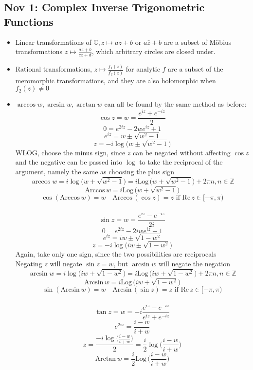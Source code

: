 \documentclass[10pt, oneside]{article}
\newcommand{\C}{\mathbb{C}}
\newcommand{\Z}{\mathbb{Z}}
\renewcommand{\Re}{\text{Re} \,}
\newcommand{\Log}{\text{Log} \,}
\newcommand{\Arccos}{\text{Arccos} \,}
\newcommand{\Arcsin}{\text{Arcsin} \,}
\newcommand{\Arctan}{\text{Arctan} \,}
\begin{document}
\subsection{Nov 1: Complex Inverse Trigonometric Functions}
\begin{itemize}
    \item Linear transformations of $\C, z \mapsto az + b$ or $a\bar{z} + b$ are a subset of M\"obius transformations $z \mapsto \frac{az + b}{cz + d}$, which arbitrary circles are closed under.
    \item Rational transformations, $z \mapsto \frac{f_1(z)}{f_2(z)}$ for analytic $f$ are a subset of the meromorphic transformations, and they are also holomorphic when $f_2(z) \neq 0$
    \item $\arccos w, \arcsin w, \arctan w$ can all be found by the same method as before:
        \[\cos z = w = \frac{e^{iz} + e^{-iz}}{2}\]
        \[0 = e^{2iz} - 2we^{iz} + 1\]
        \[e^{iz} = w \pm \sqrt{w^2 - 1}\]
        \[z = -i\log \big( w \pm \sqrt{w^2 - 1} \big)\]
        WLOG, choose the minus sign, since $z$ can be negated without affecting $\cos z$ and the negative can be passed into $\log$ to take the reciprocal of the argument, namely the same as choosing the plus sign
        \[\arccos w = i\log \big( w + \sqrt{w^2 - 1} \big) = i\Log \big( w + \sqrt{w^2 - 1} \big) + 2\pi n, n\in \Z\]
        \[\Arccos w = i\Log \big( w + \sqrt{w^2 - 1} \big)\]
        \[\cos(\Arccos w) = w \quad \Arccos(\cos z) = z \text{ if } \Re z \in [-\pi,\pi)\]
        \\
        \[\sin z = w = \frac{e^{iz} - e^{-iz}}{2i}\]
        \[0 = e^{2iz} - 2iwe^{iz} - 1\]
        \[e^{iz} = iw \pm \sqrt{1 - w^2}\]
        \[z = -i\log \big(iw \pm \sqrt{1 - w^2})\]
        Again, take only one sign, since the two possibilities are reciprocals\\
        Negating $z$ will negate $\sin z = w$, but $\arcsin w$ will negate the negation
        \[\arcsin w = i\log \big(iw + \sqrt{1 - w^2} \big) = i\Log \big( iw + \sqrt{1- w^2} \big) + 2\pi n, n\in \Z\]
        \[\Arcsin w = i\Log \big(iw + \sqrt{1 - w^2} \big)\]
        \[\sin(\Arcsin w) = w \quad \Arcsin(\sin z) = z \text{ if } \Re z \in [-\pi,\pi)\]
        \\
        \[\tan z = w = -i \frac{e^{iz} - e^{-iz}}{e^{iz} + e^{-iz}}\]
        \[e^{2iz} = \frac{i - w}{i + w}\]
        \[z = \frac{-i \log \bigg( \displaystyle \frac{i-w}{i+w} \bigg)}{2} = \frac{i}{2} \log\bigg( \frac{i-w}{i+w}\bigg)\]
        \[\Arctan w = \frac{i}{2} \Log\bigg( \frac{i-w}{i+w}\bigg)\]
\end{itemize}
\end{document}
